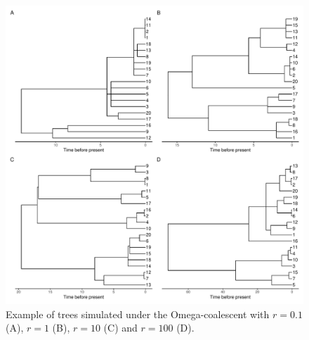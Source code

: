 \documentclass{article}
\begin{document}
\begin{figure}[!p]
\begin{center}
\includegraphics[width=15cm]{../run/figureTree.pdf}
\end{center}
\caption{Example of trees simulated under the Omega-coalescent with $r=0.1$ (A),
$r=1$ (B), $r=10$ (C) and $r=100$ (D).
\label{fig:trees}}
\end{figure}
\end{document}

